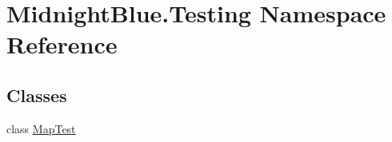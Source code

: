 \hypertarget{namespace_midnight_blue_1_1_testing}{}\section{Midnight\+Blue.\+Testing Namespace Reference}
\label{namespace_midnight_blue_1_1_testing}
\subsection*{Classes}
\begin{DoxyCompactItemize}
\item 
class \hyperlink{class_midnight_blue_1_1_testing_1_1_map_test}{Map\+Test}
\end{DoxyCompactItemize}
